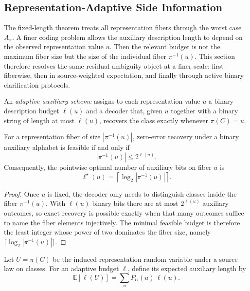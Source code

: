 \subsection{Representation-Adaptive Side Information}

The fixed-length theorem treats all representation fibers through the worst case $A_\pi$. A finer coding problem allows the auxiliary description length to depend on the observed representation value $u$. Then the relevant budget is not the maximum fiber size but the size of the individual fiber $\pi^{-1}(u)$. This section therefore resolves the same residual ambiguity object at a finer scale: first fiberwise, then in source-weighted expectation, and finally through active binary clarification protocols.

\begin{definition}
An \emph{adaptive auxiliary scheme} assigns to each representation value $u$ a binary description budget $\ell(u)$ and a decoder that, given $u$ together with a binary string of length at most $\ell(u)$, recovers the class exactly whenever $\pi(C)=u$.
\end{definition}

\begin{theorem}\label{thm:adaptive-fiber-budget}
For a representation fiber of size $|\pi^{-1}(u)|$, zero-error recovery under a binary auxiliary alphabet is feasible if and only if
\[
|\pi^{-1}(u)| \le 2^{\ell(u)}.
\]
Consequently, the pointwise optimal number of auxiliary bits on fiber $u$ is
\[
\ell^\star(u) = \left\lceil \log_2 |\pi^{-1}(u)| \right\rceil.
\]
\end{theorem}

\begin{proof}
Once $u$ is fixed, the decoder only needs to distinguish classes inside the fiber $\pi^{-1}(u)$. With $\ell(u)$ binary bits there are at most $2^{\ell(u)}$ auxiliary outcomes, so exact recovery is possible exactly when that many outcomes suffice to name the fiber elements injectively. The minimal feasible budget is therefore the least integer whose power of two dominates the fiber size, namely $\lceil \log_2 |\pi^{-1}(u)| \rceil$.
\end{proof}

\begin{definition}
Let $U=\pi(C)$ be the induced representation random variable under a source law on classes. For an adaptive budget $\ell$, define its expected auxiliary length by
\[
\mathbb E[\ell(U)] = \sum_u P_U(u)\,\ell(u).
\]
\end{definition}

